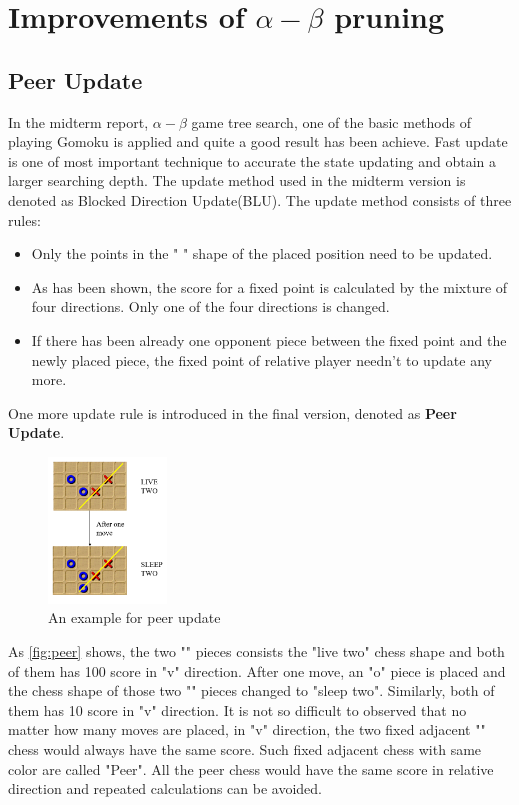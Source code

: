\documentclass[sigconf, nonacm]{acmart}
\begin{document}
\section{Improvements of $\alpha-\beta$ pruning}

\subsection{Peer Update}



\quad In the midterm report, $\alpha-\beta$ game tree search, one of the basic methods of playing Gomoku is applied and quite a good result has been achieve.
%
Fast update is one of most important technique to accurate the state updating and obtain a larger searching depth. 
%
The update method used in the midterm version is denoted as Blocked Direction Update(BLU).
%
The update method consists of three rules:
%
\begin{itemize}
\item Only the points in the 
" {\ooalign{$\times$\cr\hidewidth$+$\hidewidth\cr}} "
shape of the placed position need to be updated.
\item As has been shown, the score for a fixed point is calculated by the mixture of four directions. Only one of the four directions is changed.
\item If there has been already one opponent piece between the fixed point and the newly placed piece, the fixed point of relative player needn't to update any more.
\end{itemize}
%
One more update rule is introduced in the final version, denoted as \textbf{Peer Update}.

\begin{figure}[h]
  \centering
  \includegraphics[width=0.28\textwidth]{figures/peer_update.png}
  \caption{An example for peer update}
  \label{fig:peer}
\end{figure}

%
As \autoref{fig:peer} shows, the two "\times" pieces consists the "live two" chess shape and both of them has 100 score in "v" direction.
%
After one move, an "o" piece is placed and the chess shape of those two "\times" pieces changed to "sleep two". Similarly, both of them has 10 score in "v" direction. 
%
It is not so difficult to observed that no matter how many moves are placed, in "v" direction, the two fixed adjacent "\times" chess would always have the same score. 
Such fixed adjacent chess with same color are called "Peer". 
All the peer chess would have the same score in relative direction and repeated calculations can be avoided.
%
\end{document}
